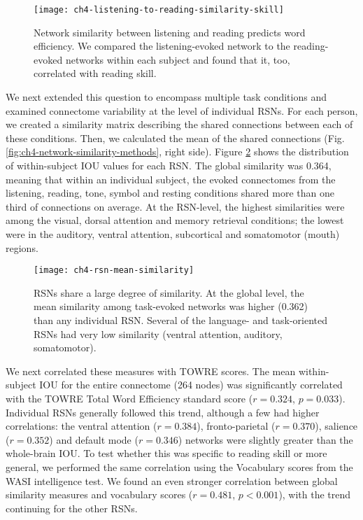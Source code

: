 \begin{figure}[t!]
	\centering
	\texttt{[image: ch4-listening-to-reading-similarity-skill]}
    \caption[Network similarity between listening and reading predicts word efficiency]{Network similarity between listening and reading predicts word efficiency. We compared the listening-evoked network to the reading-evoked networks within each subject and found that it, too, correlated with reading skill.}
	\label{fig:ch4-modality-similarity-to-reading}
\end{figure}

We next extended this question to encompass multiple task conditions and examined connectome variability at the level of individual RSNs. For each person, we created a similarity matrix describing the shared connections between each of these conditions. Then, we calculated the mean of the shared connections (Fig. \ref{fig:ch4-network-similarity-methods}, right side). Figure \ref{fig:ch4-rsn-mean-similarity} shows the distribution of within-subject IOU values for each RSN. The global similarity was 0.364, meaning that within an individual subject, the evoked connectomes from the listening, reading, tone, symbol and resting conditions shared more than one third of connections on average. At the RSN-level, the highest similarities were among the visual, dorsal attention and memory retrieval conditions; the lowest were in the auditory, ventral attention, subcortical and somatomotor (mouth) regions.

\begin{figure}[t!]
	\centering
	\texttt{[image: ch4-rsn-mean-similarity]}
    \caption[RSNs share a large degree of similarity]{RSNs share a large degree of similarity. At the global level, the mean similarity among task-evoked networks was higher (0.362) than any individual RSN. Several of the language- and task-oriented RSNs had very low similarity (ventral attention, auditory, somatomotor).}
	\label{fig:ch4-rsn-mean-similarity}
\end{figure}

We next correlated these measures with TOWRE scores. The mean within-subject IOU for the entire connectome (264 nodes) was significantly correlated with the TOWRE Total Word Efficiency standard score ($r = 0.324$, $p = 0.033$). Individual RSNs generally followed this trend, although a few had higher correlations: the ventral attention ($r=0.384$), fronto-parietal ($r=0.370$), salience ($r=0.352$) and default mode ($r=0.346$) networks were slightly greater than the whole-brain IOU. To test whether this was specific to reading skill or more general, we performed the same correlation using the Vocabulary scores from the WASI intelligence test. We found an even stronger correlation between global similarity measures and vocabulary scores ($r = 0.481$, $p < 0.001$), with the trend continuing for the other RSNs. 


